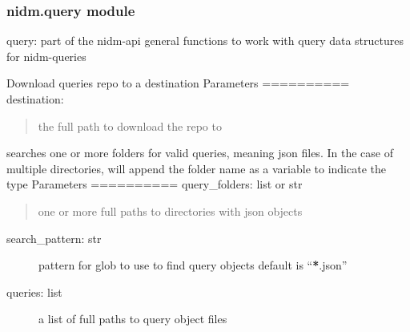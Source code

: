 \documentclass[letterpaper,10pt,english]{sphinxmanual}
\begin{document}
\subsubsection{nidm.query module}
\label{nidm:module-nidm.query}\label{nidm:nidm-query-module}
query: part of the nidm-api
general functions to work with query
data structures for nidm-queries

\begin{fulllineitems}
\label{nidm:nidm.query.do_query}
\end{fulllineitems}


\begin{fulllineitems}
\label{nidm:nidm.query.download_queries}
Download queries repo to a destination
Parameters
==========
destination:
\begin{quote}

the full path to download the repo to
\end{quote}

\end{fulllineitems}


\begin{fulllineitems}
\label{nidm:nidm.query.find_queries}
searches one or more folders for valid queries, meaning
json files. In the case of multiple directories, will
append the folder name as a variable to indicate the type
Parameters
==========
query\_folders: list or str
\begin{quote}

one or more full paths to directories with json objects
\end{quote}
\begin{description}
\item[{search\_pattern: str}] \leavevmode
pattern for glob to use to find query objects
default is ``{\color{red}\bfseries{}*}.json''

\end{description}
\begin{description}
\item[{queries: list}] \leavevmode
a list of full paths to query object files

\end{description}

\end{fulllineitems}
\end{document}
